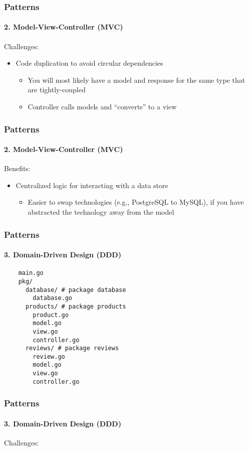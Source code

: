 \begin{frame}[fragile]
  \frametitle{Patterns}
  \framesubtitle{2. Model-View-Controller (MVC)}

  Challenges:
  \begin{itemize}
    \item Code duplication to avoid circular dependencies
    \begin{itemize}
      \item You will most likely have a model and response for the same type that are tightly-coupled
      \item Controller calls models and ``converts'' to a view
    \end{itemize}
  \end{itemize}
\end{frame}

\begin{frame}[fragile]
  \frametitle{Patterns}
  \framesubtitle{2. Model-View-Controller (MVC)}

  Benefits:
  \begin{itemize}
    \item Centralized logic for interacting with a data store
    \begin{itemize}
      \item Easier to swap technologies (e.g., PostgreSQL to MySQL), if you have abstracted the technology away from the model

    \end{itemize}
  \end{itemize}

\end{frame}

\begin{frame}[fragile]
  \frametitle{Patterns}
  \framesubtitle{3. Domain-Driven Design (DDD)}

  \begin{verbatim}
    main.go
    pkg/
      database/ # package database
        database.go
      products/ # package products
        product.go
        model.go
        view.go
        controller.go
      reviews/ # package reviews
        review.go
        model.go
        view.go
        controller.go
  \end{verbatim}
\end{frame}

\begin{frame}[fragile]
  \frametitle{Patterns}
  \framesubtitle{3. Domain-Driven Design (DDD)}

  Challenges:
\end{frame}

